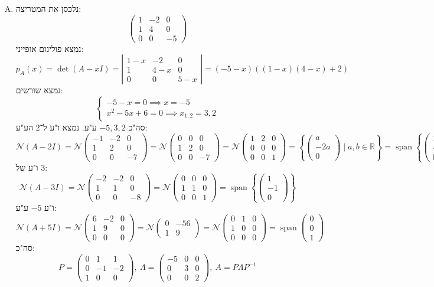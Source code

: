 \documentclass[]{article}
\newcommand\R     {\mathbb{R}}
\newcommand\nc    {\mathcal{N}}
\DeclareMathOperator{\Sp}     {span}
\newcommand\xot       {x_{1, 2}}
\newcommand\pms[1]    {\begin{pmatrix}
		#1
\end{pmatrix}}
\newcommand\detms[1]  {\left\vert\begin{matrix}
		#1
\end{matrix}\right\vert}
\newcommand\Lg        {\Lambda}
\newcommand\op    {^{-1}}
\newcommand\ccb[1]    {\left \{ #1 \right \}}
\theoremstyle{definition}
\begin{document}
\begin{enumerate}[A)]
		\item נלכסן את המטריצה: 
		\[ \pms{1 & -2 & 0 \\ 1 & 4 & 0 \\ 0 & 0 & -5} \]
		נמצא פולינום אופייני: 
		\[ p_A(x) = \det(A - xI) = \detms{1 - x & -2 & 0 \\ 1 & 4 - x & 0 \\ 0 & 0 & 5 - x} = (-5 - x)((1 - x)(4 - x) + 2) \]
		נמצא שורשים: 
		\[ \begin{cases}
			-5 - x = 0 \implies x = -5 \\
			x^2 - 5x + 6 = 0 \implies \xot = 3, 2
		\end{cases} \]
		סה"כ $-5, 3, 2$ ע"ע. נמצא ו"ע ל־$2$ הע"ע: 
		\[ \nc(A - 2I) = \nc\pms{-1 & -2 & 0 \\ 1 & 2 & 0 \\ 0 & 0 & -7} = \nc\pms{0 & 0 & 0 \\ 1 & 2 & 0 \\ 0 & 0 & -7} = \nc \pms{1 & 2 & 0 \\ 0 & 0 & 0 \\ 0 & 0 & 1} = \ccb{\pms{a \\ -2a \\ 0} \mid a, b \in \R} = \Sp\ccb{\pms{1 \\ -2 \\ 0}} \]
		ו"ע של $3$: 
		\[ \nc(A - 3I) = \nc\pms{-2 & -2 & 0 \\ 1 & 1 & 0 \\ 0 & 0 & -8} = \nc\pms{0 & 0 & 0 \\ 1 & 1 & 0 \\ 0 & 0 & 1} = \Sp\ccb{\pms{1 \\ - 1 \\ 0}} \]
		ו"ע $-5$ ע"ע: 
		\[ \nc(A + 5I) = \nc\pms{6 & -2 & 0 \\ 1& 9 & 0 \\ 0 & 0 & 0} = \nc\pms{0 & -56 \\ 1 & 9} = \nc\pms{0 & 1 & 0 \\ 1 & 0 & 0 \\ 0 & 0 & 0} = \Sp\pms{0 \\ 0 \\ 1} \]
		סה"כ: 
		\[ P = \pms{0 & 1 & 1\\ 0 & -1 & -2 \\ 1 & 0 & 0}, \ \Lg = \pms{-5 & 0 & 0 \\ 0 & 3 & 0 \\ 0 & 0 & 2}, \ A = P\Lg P\op \]
		

\end{enumerate}
\end{document}
